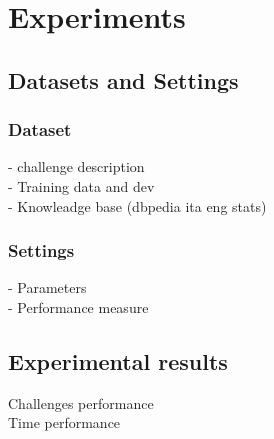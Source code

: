 \chapter{Experiments}


\section{Datasets and Settings}
	\subsection{Dataset}
	- challenge description	\\
	- Training data and dev\\
	- Knowleadge base (dbpedia ita eng stats)
	\subsection{Settings}
	- Parameters \\
	- Performance measure

\section{Experimental results}
Challenges performance\\
Time performance